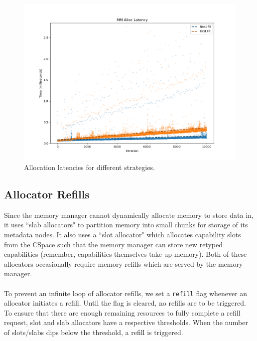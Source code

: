 \begin{figure}[ht]
    \centering
    \includegraphics[width=\columnwidth]{images/mm_alloc_scatter.png}
    \caption{Allocation latencies for different strategies.}
    \label{figure:mm_alloc_scatter}
\end{figure}

\subsection{Allocator Refills}
Since the memory manager cannot dynamically allocate memory to store data in, it uses ``slab allocators" to partition memory into small chunks for storage of its metadata nodes. It also uses a ``slot allocator" which allocates capability slots from the CSpace such that the memory manager can store new retyped capabilities (remember, capabilities themselves take up memory). Both of these allocators occasionally require memory refills which are served by the memory manager.
\\\\
To prevent an infinite loop of allocator refills, we set a \texttt{refill} flag whenever an allocator initiates a refill. Until the flag is cleared, no refills are to be triggered. To ensure that there are enough remaining resources to fully complete a refill request, slot and slab allocators have a respective thresholds. When the number of slots/slabs dips below the threshold, a refill is triggered. 

